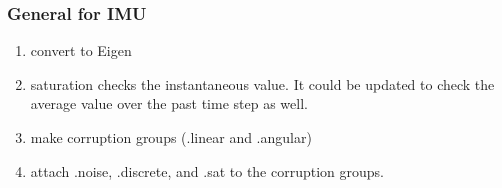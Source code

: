 \documentclass[]{BasiliskReportMemo}
\begin{document}
\subsubsection{General for IMU}
\begin{enumerate}
	\item convert to Eigen
	\item saturation checks the instantaneous value. It could be updated to check the average value over the past time step as well.
	\item make corruption groups (.linear and .angular)
	\item attach .noise, .discrete, and .sat to the corruption groups.
\end{enumerate}






\end{document}

